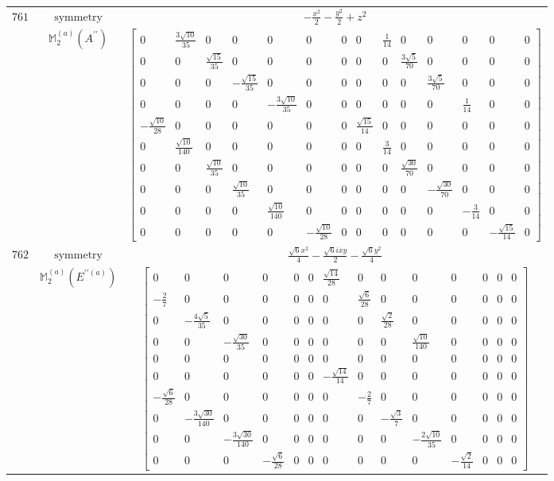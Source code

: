 \documentclass[fleqn,8pt,landscape]{jsarticle}
\begin{document}
\begin{longtable}{ccc}
$ 761 $ & $ \text{symmetry} $ & $ - \frac{x^{2}}{2} - \frac{y^{2}}{2} + z^{2} $ \\
$  $ & $ \mathbb{M}_{2}^{(a)}(A^{\prime\prime}) $ & $ \begin{bmatrix} 0 & \frac{3 \sqrt{10}}{35} & 0 & 0 & 0 & 0 & 0 & 0 & \frac{1}{14} & 0 & 0 & 0 & 0 & 0 \\ 0 & 0 & \frac{\sqrt{15}}{35} & 0 & 0 & 0 & 0 & 0 & 0 & \frac{3 \sqrt{5}}{70} & 0 & 0 & 0 & 0 \\ 0 & 0 & 0 & - \frac{\sqrt{15}}{35} & 0 & 0 & 0 & 0 & 0 & 0 & \frac{3 \sqrt{5}}{70} & 0 & 0 & 0 \\ 0 & 0 & 0 & 0 & - \frac{3 \sqrt{10}}{35} & 0 & 0 & 0 & 0 & 0 & 0 & \frac{1}{14} & 0 & 0 \\ - \frac{\sqrt{10}}{28} & 0 & 0 & 0 & 0 & 0 & 0 & \frac{\sqrt{15}}{14} & 0 & 0 & 0 & 0 & 0 & 0 \\ 0 & \frac{\sqrt{10}}{140} & 0 & 0 & 0 & 0 & 0 & 0 & \frac{3}{14} & 0 & 0 & 0 & 0 & 0 \\ 0 & 0 & \frac{\sqrt{10}}{35} & 0 & 0 & 0 & 0 & 0 & 0 & \frac{\sqrt{30}}{70} & 0 & 0 & 0 & 0 \\ 0 & 0 & 0 & \frac{\sqrt{10}}{35} & 0 & 0 & 0 & 0 & 0 & 0 & - \frac{\sqrt{30}}{70} & 0 & 0 & 0 \\ 0 & 0 & 0 & 0 & \frac{\sqrt{10}}{140} & 0 & 0 & 0 & 0 & 0 & 0 & - \frac{3}{14} & 0 & 0 \\ 0 & 0 & 0 & 0 & 0 & - \frac{\sqrt{10}}{28} & 0 & 0 & 0 & 0 & 0 & 0 & - \frac{\sqrt{15}}{14} & 0 \end{bmatrix} $ \\ \hline
$ 762 $ & $ \text{symmetry} $ & $ \frac{\sqrt{6} x^{2}}{4} - \frac{\sqrt{6} i x y}{2} - \frac{\sqrt{6} y^{2}}{4} $ \\
$  $ & $ \mathbb{M}_{2}^{(a)}(E^{\prime\prime(a)}) $ & $ \begin{bmatrix} 0 & 0 & 0 & 0 & 0 & 0 & \frac{\sqrt{14}}{28} & 0 & 0 & 0 & 0 & 0 & 0 & 0 \\ - \frac{2}{7} & 0 & 0 & 0 & 0 & 0 & 0 & \frac{\sqrt{6}}{28} & 0 & 0 & 0 & 0 & 0 & 0 \\ 0 & - \frac{4 \sqrt{5}}{35} & 0 & 0 & 0 & 0 & 0 & 0 & \frac{\sqrt{2}}{28} & 0 & 0 & 0 & 0 & 0 \\ 0 & 0 & - \frac{\sqrt{30}}{35} & 0 & 0 & 0 & 0 & 0 & 0 & \frac{\sqrt{10}}{140} & 0 & 0 & 0 & 0 \\ 0 & 0 & 0 & 0 & 0 & 0 & 0 & 0 & 0 & 0 & 0 & 0 & 0 & 0 \\ 0 & 0 & 0 & 0 & 0 & 0 & - \frac{\sqrt{14}}{14} & 0 & 0 & 0 & 0 & 0 & 0 & 0 \\ - \frac{\sqrt{6}}{28} & 0 & 0 & 0 & 0 & 0 & 0 & - \frac{2}{7} & 0 & 0 & 0 & 0 & 0 & 0 \\ 0 & - \frac{3 \sqrt{30}}{140} & 0 & 0 & 0 & 0 & 0 & 0 & - \frac{\sqrt{3}}{7} & 0 & 0 & 0 & 0 & 0 \\ 0 & 0 & - \frac{3 \sqrt{30}}{140} & 0 & 0 & 0 & 0 & 0 & 0 & - \frac{2 \sqrt{10}}{35} & 0 & 0 & 0 & 0 \\ 0 & 0 & 0 & - \frac{\sqrt{6}}{28} & 0 & 0 & 0 & 0 & 0 & 0 & - \frac{\sqrt{2}}{14} & 0 & 0 & 0 \end{bmatrix} $ \\ \hline

\end{longtable}
\end{document}
